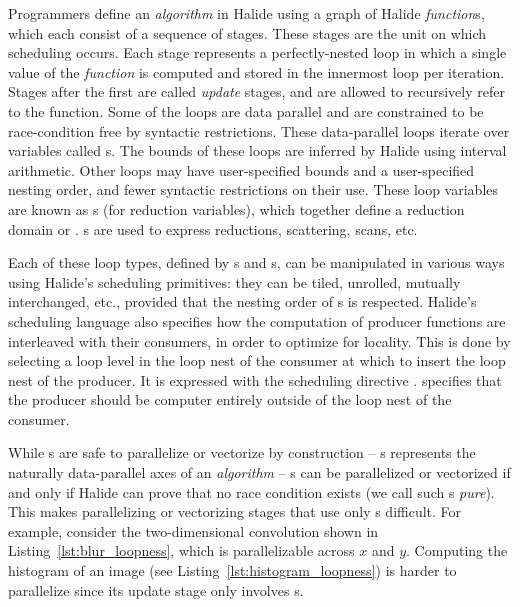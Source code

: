 Programmers define an \emph{algorithm} in Halide using a graph of Halide \emph{function}s, which each consist of a sequence of stages. These stages are the unit on which scheduling occurs. Each stage represents a perfectly-nested loop in which a single value of the \emph{function} is computed and stored in the innermost loop per iteration. Stages after the first are called \emph{update} stages, and are allowed to recursively refer to the function. Some of the loops are data parallel and are constrained to be race-condition free by syntactic restrictions. These data-parallel loops iterate over variables called s. The bounds of these loops are inferred by Halide using interval arithmetic. Other loops may have user-specified bounds and a user-specified nesting order, and fewer syntactic restrictions on their use. These loop variables are known as s (for reduction variables), which together define a reduction domain or . s are used to express reductions, scattering, scans, etc.

Each of these loop types, defined by s and s, can be manipulated in various ways using Halide's scheduling primitives: they can be tiled, unrolled, mutually interchanged, etc., provided that the nesting order of s is respected. Halide's scheduling language also specifies how the computation of producer functions are interleaved with their consumers, in order to optimize for locality. This is done by selecting a loop level in the loop nest of the consumer at which to insert the loop nest of the producer. It is expressed with the scheduling directive .  specifies that the producer should be computer entirely outside of the loop nest of the consumer.

While s are safe to parallelize or vectorize by construction -- s represents the naturally data-parallel axes of an \emph{algorithm} -- s can be parallelized or vectorized if and only if Halide can prove that no race condition exists (we call such s \emph{pure}). This makes parallelizing or vectorizing stages that use only s difficult. For example, consider the two-dimensional convolution shown in Listing~\ref{lst:blur_loopness}, which is parallelizable across  $x$ and $y$. Computing the histogram of an image (see Listing~\ref{lst:histogram_loopness}) is harder to parallelize since its update stage only involves s.

